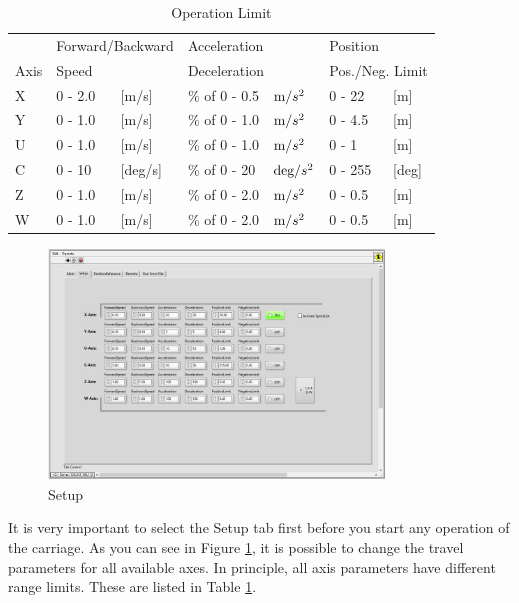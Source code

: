 \documentclass[a4paper,english]{report}
\begin{document}
\begin{table}
	\centering{}%
	\begin{tabular}{lllllll}
		\hline 
		& \multicolumn{2}{l}{Forward/Backward} & \multicolumn{2}{l}{Acceleration} & \multicolumn{2}{l}{Position}\tabularnewline
		Axis & \multicolumn{2}{l}{Speed} & \multicolumn{2}{l}{Deceleration} & \multicolumn{2}{l}{Pos./Neg. Limit}\tabularnewline
		\hline 
		X & 0 - 2.0 & {[}m/s{]}  & \% of 0 - 0.5 & $\text{m/\ensuremath{s^{2}}}$ & 0 - 22 & {[}m{]}\tabularnewline
		Y & 0 - 1.0 & {[}m/s{]}  & \% of 0 - 1.0 & $\text{m/\ensuremath{s^{2}}}$ & 0 - 4.5 & {[}m{]}\tabularnewline
		U & 0 - 1.0 & {[}m/s{]}  & \% of 0 - 1.0 & $\text{m/\ensuremath{s^{2}}}$ & 0 - 1 & {[}m{]}\tabularnewline
		C & 0 - 10  & {[}deg/s{]} & \% of 0 - 20 & $\text{deg/\ensuremath{s^{2}}}$ & 0 - 255 & {[}deg{]}\tabularnewline
		Z & 0 - 1.0 & {[}m/s{]}  & \% of 0 - 2.0 & $\text{m/\ensuremath{s^{2}}}$ & 0 - 0.5 & {[}m{]}\tabularnewline
		W & 0 - 1.0 & {[}m/s{]}  & \% of 0 - 2.0 & $\text{m/\ensuremath{s^{2}}}$ & 0 - 0.5 & {[}m{]}\tabularnewline
		\hline 
	\end{tabular}\caption{\label{tab: Operation Limit}Operation Limit}
\end{table}

\begin{figure}[htb!]
	\centering \includegraphics[width=0.8\textwidth]{fig/towing_parameteres}
	\caption{Setup}
	\label{fig: Towing parameters}
\end{figure}

It is very important to select the Setup tab first before you start any operation of the carriage. As you can see in Figure \ref{fig: Towing parameters}, it is possible to change the travel parameters for all available axes. In principle, all axis parameters have different range limits. These are listed in Table \ref{tab: Operation Limit}.
\end{document}
